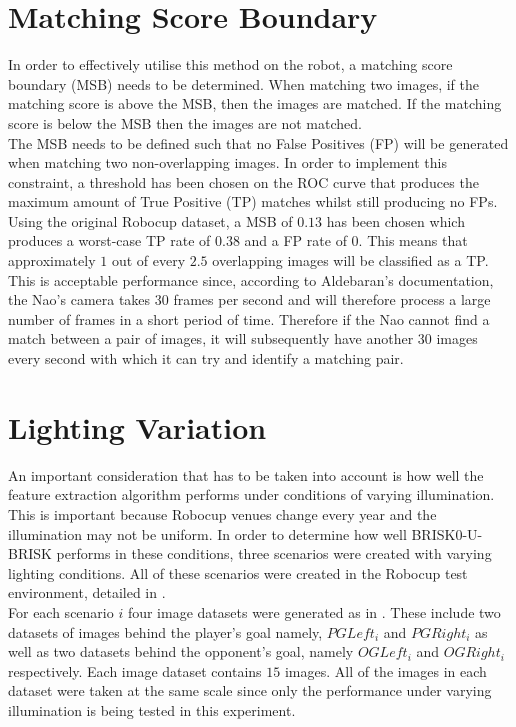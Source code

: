 \documentclass[11pt]{report}
\begin{document}
\section{Matching Score Boundary}
\label{sec:matchingScoreBoundary}
In order to effectively utilise this method on the robot, a matching score boundary (MSB) needs to be determined. When matching two images, if the matching score is above the MSB, then the images are matched. If the matching score is below the MSB then the images are not matched. \\

The MSB needs to be defined such that no False Positives (FP) will be generated when matching two non-overlapping images. In order to implement this constraint, a threshold has been chosen on the ROC curve that produces the maximum amount of True Positive (TP) matches whilst still producing no FPs. Using the original Robocup dataset, a MSB of $0.13$ has been chosen which produces a worst-case TP rate of $0.38$ and a FP rate of $0$. This means that approximately $1$ out of every $2.5$ overlapping images will be classified as a TP. This is acceptable performance since, according to Aldebaran's documentation, the Nao's camera takes $30$ frames per second and will therefore process a large number of frames in a short period of time. Therefore if the Nao cannot find a match between a pair of images, it will subsequently have another $30$ images every second with which it can try and identify a matching pair.\\

\section{Lighting Variation}
\label{sec:lighting}
An important consideration that has to be taken into account is how well the feature extraction algorithm performs under conditions of varying illumination. This is important because Robocup venues change every year and the illumination may not be uniform. In order to determine how well BRISK0-U-BRISK performs in these conditions, three scenarios were created with varying lighting conditions. All of these scenarios were created in the Robocup test environment, detailed in .\\ 

For each scenario $i$ four image datasets were generated as in . These include  two datasets of images behind the player's goal namely, \textit{$PG Left_{i}$} and \textit{$PG Right_i$} as well as two datasets behind the opponent's goal, namely \textit{$OG Left_i$} and \textit{$OG Right_i$} respectively. Each image dataset contains $15$ images. All of the images in each dataset were taken at the same scale since only the performance under varying illumination is being tested in this experiment.\\ 
\end{document}
